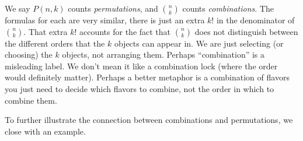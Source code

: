 \documentclass[11pt,]{book}
\theoremstyle{ptxplainnotitle}
\theoremstyle{ptxplaintitle}
\theoremstyle{ptxdefinitionnotitle}
\theoremstyle{ptxdefinitiontitle}
\theoremstyle{ptxdefinitionnotitle}
\theoremstyle{ptxdefinitiontitle}
\theoremstyle{ptxdefinitionnotitle}
\theoremstyle{ptxdefinitiontitle}
\theoremstyle{ptxdefinitiontitlenonumber}
\theoremstyle{ptxdefinitiontitlenonumber}
\numberwithin{equation}{chapter}
\begin{document}
\hypertarget{p-1441}{}%
We say \(P(n,k)\) counts \emph{permutations}, and \({n \choose k}\) counts \emph{combinations}. The formulas for each are very similar, there is just an extra \(k!\) in the denominator of \({n \choose k}\). That extra \(k!\) accounts for the fact that \({n \choose k}\) does not distinguish between the different orders that the \(k\) objects can appear in. We are just selecting (or choosing) the \(k\) objects, not arranging them. Perhaps ``combination'' is a misleading label. We don't mean it like a combination lock (where the order would definitely matter). Perhaps a better metaphor is a combination of flavors \textemdash{} you just need to decide which flavors to combine, not the order in which to combine them.%
\par
\hypertarget{p-1442}{}%
To further illustrate the connection between combinations and permutations, we close with an example.%
\end{document}
